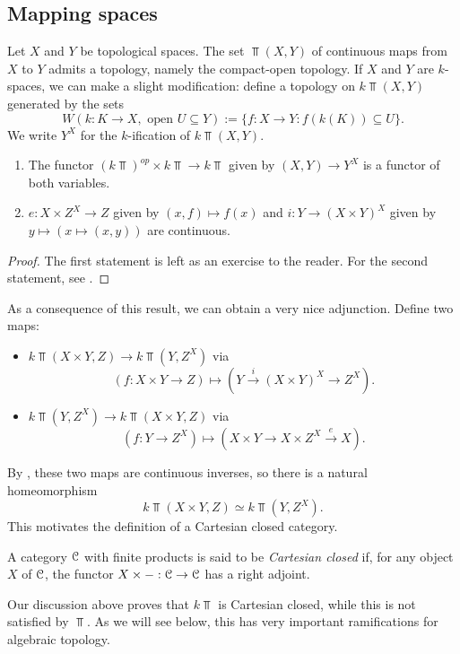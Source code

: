 \subsection{Mapping spaces}\label{mappingspaces}
Let $X$ and $Y$ be topological spaces.
The set $\Top(X,Y)$ of continuous maps from $X$ to $Y$ admits a topology, namely the compact-open topology.
If $X$ and $Y$ are $k$-spaces, we can make a slight modification:
define a topology on $k\Top(X,Y)$ generated by the sets
$$W(k:K\to X, \text{ open }U\subseteq Y) := \{f:X\to Y: f(k(K))\subseteq U\}.$$
We write $Y^X$ for the $k$-ification of $k\Top(X,Y)$.
\begin{prop}
    \begin{enumerate}
	\item The functor $(k\Top)^{op}\times k\Top\to k\Top$ given by $(X,Y)\to Y^X$ is a functor of both variables.
	\item $e:X\times Z^X\to Z$ given by $(x,f)\mapsto f(x)$ and $i:Y\to (X\times Y)^X$ given by $y\mapsto(x\mapsto(x,y))$ are continuous.
    \end{enumerate}
\end{prop}
\begin{proof}
    The first statement is left as an exercise to the reader.
    For the second statement, see \cite[Proposition 2.11]{StricklandCGWH}.
\end{proof}
As a consequence of this result, we can obtain a very nice adjunction.
Define two maps:
\begin{itemize}
    \item $k\Top(X\times Y,Z)\to k\Top(Y,Z^X)$ via
	$$(f:X\times Y\to Z)\mapsto (Y\xrightarrow{i}(X\times Y)^X\to Z^X).$$
    \item $k\Top(Y,Z^X) \to k\Top(X\times Y,Z)$ via
	$$(f:Y\to Z^X)\mapsto(X\times Y\to X\times Z^X\xrightarrow{e} X).$$
\end{itemize}
By \cite[Proposition 2.12]{StricklandCGWH}, these two maps are continuous inverses, so there is a natural homeomorphism
$$k\Top(X\times Y,Z)\simeq k\Top(Y,Z^X).$$
This motivates the definition of a {Cartesian closed} category.
\begin{definition}
    A category $\mathcal C$ with finite products is said to be
    \emph{Cartesian closed} if, for any object $X$ of $\mathcal C$, the functor $X\times -:\mathcal C\to \mathcal C$ has a right adjoint.
\end{definition}
Our discussion above proves that $k\Top$ is Cartesian closed, while this is not satisfied by $\Top$.
As we will see below, this has very important ramifications for algebraic topology.
\begin{exercise}
\end{exercise}

